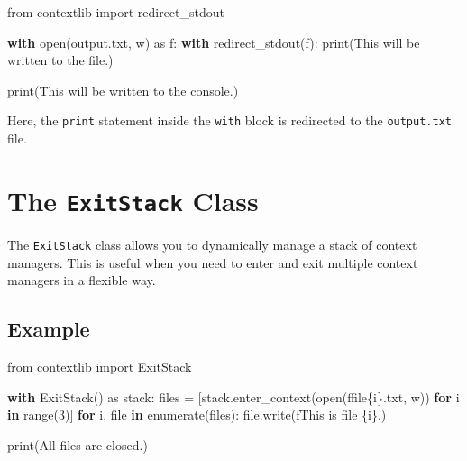 \documentclass[
  letterpaper,
  DIV=11,
  numbers=noendperiod]{scrreprt}
\newenvironment{Shaded}{\begin{snugshade}}{\end{snugshade}}
\newcommand{\BuiltInTok}[1]{\textcolor[rgb]{0.00,0.23,0.31}{#1}}
\newcommand{\ControlFlowTok}[1]{\textcolor[rgb]{0.00,0.23,0.31}{\textbf{#1}}}
\newcommand{\DecValTok}[1]{\textcolor[rgb]{0.68,0.00,0.00}{#1}}
\newcommand{\ImportTok}[1]{\textcolor[rgb]{0.00,0.46,0.62}{#1}}
\newcommand{\KeywordTok}[1]{\textcolor[rgb]{0.00,0.23,0.31}{\textbf{#1}}}
\newcommand{\NormalTok}[1]{\textcolor[rgb]{0.00,0.23,0.31}{#1}}
\newcommand{\OperatorTok}[1]{\textcolor[rgb]{0.37,0.37,0.37}{#1}}
\newcommand{\SpecialCharTok}[1]{\textcolor[rgb]{0.37,0.37,0.37}{#1}}
\newcommand{\SpecialStringTok}[1]{\textcolor[rgb]{0.13,0.47,0.30}{#1}}
\newcommand{\StringTok}[1]{\textcolor[rgb]{0.13,0.47,0.30}{#1}}
\begin{document}
\begin{Shaded}
\begin{Highlighting}[]
\ImportTok{from}\NormalTok{ contextlib }\ImportTok{import}\NormalTok{ redirect\_stdout}

\ControlFlowTok{with} \BuiltInTok{open}\NormalTok{(}\StringTok{\textquotesingle{}output.txt\textquotesingle{}}\NormalTok{, }\StringTok{\textquotesingle{}w\textquotesingle{}}\NormalTok{) }\ImportTok{as}\NormalTok{ f:}
    \ControlFlowTok{with}\NormalTok{ redirect\_stdout(f):}
        \BuiltInTok{print}\NormalTok{(}\StringTok{\textquotesingle{}This will be written to the file.\textquotesingle{}}\NormalTok{)}

\BuiltInTok{print}\NormalTok{(}\StringTok{\textquotesingle{}This will be written to the console.\textquotesingle{}}\NormalTok{)}
\end{Highlighting}
\end{Shaded}

Here, the \texttt{print} statement inside the \texttt{with} block is
redirected to the \texttt{output.txt} file.

\section{\texorpdfstring{The \texttt{ExitStack}
Class}{The ExitStack Class}}\label{the-exitstack-class}

The \texttt{ExitStack} class allows you to dynamically manage a stack of
context managers. This is useful when you need to enter and exit
multiple context managers in a flexible way.

\subsection{Example}\label{example-34}

\begin{Shaded}
\begin{Highlighting}[]
\ImportTok{from}\NormalTok{ contextlib }\ImportTok{import}\NormalTok{ ExitStack}

\ControlFlowTok{with}\NormalTok{ ExitStack() }\ImportTok{as}\NormalTok{ stack:}
\NormalTok{    files }\OperatorTok{=}\NormalTok{ [stack.enter\_context(}\BuiltInTok{open}\NormalTok{(}\SpecialStringTok{f\textquotesingle{}file}\SpecialCharTok{\{}\NormalTok{i}\SpecialCharTok{\}}\SpecialStringTok{.txt\textquotesingle{}}\NormalTok{, }\StringTok{\textquotesingle{}w\textquotesingle{}}\NormalTok{)) }\ControlFlowTok{for}\NormalTok{ i }\KeywordTok{in} \BuiltInTok{range}\NormalTok{(}\DecValTok{3}\NormalTok{)]}
    \ControlFlowTok{for}\NormalTok{ i, }\BuiltInTok{file} \KeywordTok{in} \BuiltInTok{enumerate}\NormalTok{(files):}
        \BuiltInTok{file}\NormalTok{.write(}\SpecialStringTok{f\textquotesingle{}This is file }\SpecialCharTok{\{}\NormalTok{i}\SpecialCharTok{\}}\SpecialStringTok{.\textquotesingle{}}\NormalTok{)}

\BuiltInTok{print}\NormalTok{(}\StringTok{\textquotesingle{}All files are closed.\textquotesingle{}}\NormalTok{)}
\end{Highlighting}
\end{Shaded}
\end{document}
